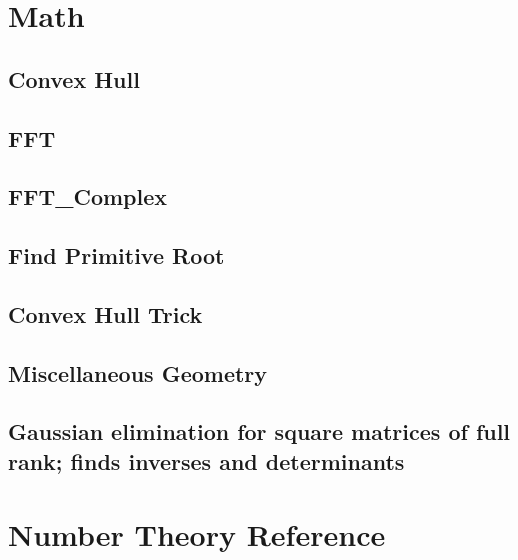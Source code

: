 \documentclass[9pt]{extarticle}
\begin{document}
\begin{multicols*}{3}
\section{Math}

\subsection{Convex Hull} %


\subsection{FFT} %


\subsection{FFT\_Complex} %


\subsection{Find Primitive Root } %


\subsection{Convex Hull Trick} %



\subsection{Miscellaneous Geometry} %


\subsection{Gaussian elimination for square matrices of full rank; finds
inverses and determinants} %


\section{Number Theory Reference}

% 


\end{multicols*}
\end{document}
